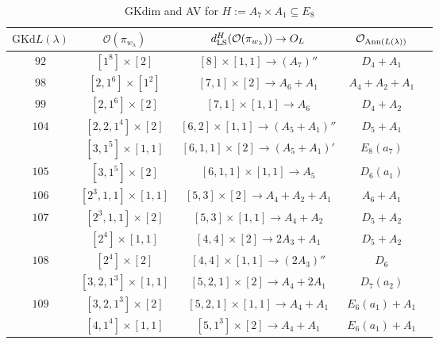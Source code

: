 \documentclass[reqno,12pt]{amsart}
\numberwithin{equation}{section}
\theoremstyle{plain}
\theoremstyle{definition}
\newcommand{\lam}{\lambda}
\renewcommand{\subset}{\subseteq}
\begin{document}
\begin{table}[htbp]\caption{ GKdim and AV for $H:=A_7\times A_1\subset E_8$}
	\label{taba7a1}
	\centering
	\renewcommand{\arraystretch}{1.5}
	\setlength\tabcolsep{5pt}
	
\small	\begin{tabular}{|c|c|c|c|c|}
		\hline $\mathrm{GKd} L(\lambda)$ &    $\mathcal{O}({\pi_{w_{\lam}}})$& $d_{\rm LS}^{H}(\mathcal{O}(\pi_{w_\lambda}))\rightarrow   O_{L}$ & $\mathcal{O}_{{\rm Ann}(L(\lambda))}$ \\ \hline
		 $ 92 $    &  $ [1^8]\times [2] $  &  $ [8]\times [1,1]\rightarrow (A_7)''$     &   $ D_4+A_1$      \\ 
 \hline
		$ 98$    &  $ [2,1^6]\times [1^2]$  &$[7,1]\times [2]\rightarrow      A_6+A_1 $  &   $A_4+A_2+A_1 $        \\ \hline

$ 99$    &  $ [2,1^6]\times [2] $  &$[7,1]\times [1,1]\rightarrow      A_6$  &   $D_4+A_2 $        \\ \hline

$ 104$    &  $ [2,2,1^4]\times [2]$  &$[6,2]\times [1,1]\rightarrow      (A_5+A_1)''$ &   $D_5+A_1 $        \\

&  $ [3,1^5]\times [1,1]$  &$[6,1,1]\times [2]\rightarrow      (A_5+A_1)'$  &   $E_8(a_7) $        \\
\hline
$ 105$ 
&  $ [3,1^5]\times [2]$  &$[6,1,1]\times [1,1]\rightarrow  A_5$  &   $D_6(a_1) $       \\\hline

$ 106$ 
&  $ [2^3,1,1]\times [1,1]$  &$[5,3]\times [2]\rightarrow  A_4+A_2+A_1$  &   $A_6+A_1 $       \\\hline

$ 107$ 
&  $ [2^3,1,1]\times [2]$  &$[5,3]\times [1,1]\rightarrow  A_4+A_2$  &   $D_5+A_2 $       \\
&  $ [2^4]\times [1,1]$  &$[4,4]\times [2]\rightarrow  2A_3+A_1$  &   $D_5+A_2 $       \\
\hline

$ 108$ 
&  $ [2^4]\times [2]$  &$[4,4]\times [1,1]\rightarrow  (2A_3)''$ &   $D_6 $       \\

&  $ [3,2,1^3]\times [1,1]$  &$[5,2,1]\times [2]\rightarrow  A_4+2A_1$  &   $D_7(a_2) $       \\
\hline

$ 109$ 
&  $ [3,2,1^3]\times [2]$  &$[5,2,1]\times [1,1]\rightarrow  A_4+A_1$  &   $E_6(a_1)+A_1 $       \\
&  $ [4,1^4]\times [1,1]$  &$[5,1^3]\times [2]\rightarrow  A_4+A_1$  &   $E_6(a_1)+A_1$       \\
\hline


\end{tabular}
\end{table}
\end{document}
